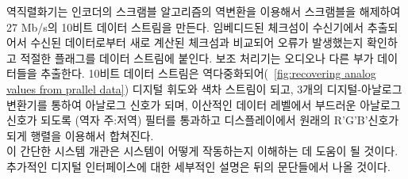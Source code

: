 역직렬화기는 인코더의 스크램블 알고리즘의 역변환을 이용해서 스크램블을 해제하여 27 Mb/s의 10비트 데이터 스트림을 만든다. 임베디드된 체크섬이 수신기에서 추출되어서 수신된 데이터로부터 새로 계산된 체크섬과 비교되어 오류가 발생했는지 확인하고 적절한 플래그를 데이터 스트림에 붙인다.
보조 처리기는 오디오나 다른 부가 데이터들을 추출한다.
10비트 데이터 스트림은 역다중화되어(\figurename~\ref{fig:recovering analog values from prallel data}) 디지털 휘도와 색차 스트림이 되고, 3개의 디지털-아날로그 변환기를 통하여 아날로그 신호가 되며, 이산적인 데이터 레벨에서 부드러운 아날로그 신호가 되도록 (역자 주:저역) 필터를 통과하고 디스플레이에서 원래의 R'G'B'신호가 되게 행렬을 이용해서 합쳐진다.
\\
이 간단한 시스템 개관은 시스템이 어떻게 작동하는지 이해하는 데 도움이 될 것이다. 추가적인 디지털 인터페이스에 대한 세부적인 설명은 뒤의 문단들에서 나올 것이다.

